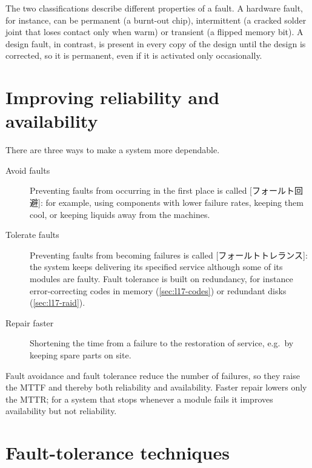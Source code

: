 \documentclass[../main.tex]{subfiles}
\begin{document}
The two classifications describe different properties of a fault.  A
hardware fault, for instance, can be permanent (a burnt-out chip),
intermittent (a cracked solder joint that loses contact only when warm) or
transient (a flipped memory bit).  A design fault, in contrast, is present in
every copy of the design until the design is corrected, so it is permanent,
even if it is activated only occasionally.

\section{Improving reliability and availability}
\label{sec:l17-improving}

There are three ways to make a system more dependable.

\begin{description}
  \item[Avoid faults] Preventing faults from occurring in the first place is
    called [フォールト回避]: for example, using
    components with lower failure rates, keeping them cool, or keeping
    liquids away from the machines.
  \item[Tolerate faults] Preventing faults from becoming failures is called
    [フォールトトレランス]: the system keeps
    delivering its specified service although some of its modules are
    faulty.  Fault tolerance is built on redundancy, for instance
    error-correcting codes in memory (\cref{sec:l17-codes}) or redundant
    disks (\cref{sec:l17-raid}).
  \item[Repair faster] Shortening the time from a failure to the restoration
    of service, e.g.\ by keeping spare parts on site.
\end{description}

\begin{keypoint}
  Fault avoidance and fault tolerance reduce the number of failures, so they
  raise the MTTF and thereby both reliability and availability.  Faster
  repair lowers only the MTTR; for a system that stops whenever a module
  fails it improves availability but not reliability.
\end{keypoint}

\section{Fault-tolerance techniques}
\label{sec:l17-techniques}
\end{document}
